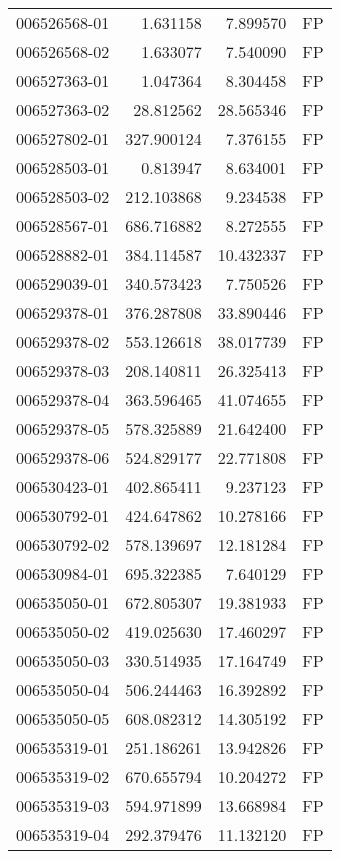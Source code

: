 \begin{tabular}{lrrl}
006526568-01 &    1.631158 &     7.899570 &   FP \\
006526568-02 &    1.633077 &     7.540090 &   FP \\
006527363-01 &    1.047364 &     8.304458 &   FP \\
006527363-02 &   28.812562 &    28.565346 &   FP \\
006527802-01 &  327.900124 &     7.376155 &   FP \\
006528503-01 &    0.813947 &     8.634001 &   FP \\
006528503-02 &  212.103868 &     9.234538 &   FP \\
006528567-01 &  686.716882 &     8.272555 &   FP \\
006528882-01 &  384.114587 &    10.432337 &   FP \\
006529039-01 &  340.573423 &     7.750526 &   FP \\
006529378-01 &  376.287808 &    33.890446 &   FP \\
006529378-02 &  553.126618 &    38.017739 &   FP \\
006529378-03 &  208.140811 &    26.325413 &   FP \\
006529378-04 &  363.596465 &    41.074655 &   FP \\
006529378-05 &  578.325889 &    21.642400 &   FP \\
006529378-06 &  524.829177 &    22.771808 &   FP \\
006530423-01 &  402.865411 &     9.237123 &   FP \\
006530792-01 &  424.647862 &    10.278166 &   FP \\
006530792-02 &  578.139697 &    12.181284 &   FP \\
006530984-01 &  695.322385 &     7.640129 &   FP \\
006535050-01 &  672.805307 &    19.381933 &   FP \\
006535050-02 &  419.025630 &    17.460297 &   FP \\
006535050-03 &  330.514935 &    17.164749 &   FP \\
006535050-04 &  506.244463 &    16.392892 &   FP \\
006535050-05 &  608.082312 &    14.305192 &   FP \\
006535319-01 &  251.186261 &    13.942826 &   FP \\
006535319-02 &  670.655794 &    10.204272 &   FP \\
006535319-03 &  594.971899 &    13.668984 &   FP \\
006535319-04 &  292.379476 &    11.132120 &   FP \\

\end{tabular}
